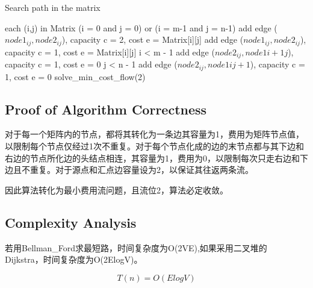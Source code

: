 \documentclass{article}
\begin{document}
\begin{CJK*}{UTF8}{gbsn}
\begin{algorithm}[htbp]  
  \caption{Search path in the matrix}  
  \begin{algorithmic}[1] 
	\For each (i,j) in Matrix
	\If (i = 0 and j = 0) or (i = m-1 and j = n-1)
	\State add edge ($node1_{ij}, node2_{ij}$), capacity c = 2, cost e = Matrix[i][j]
	\Else
	\State add edge ($node1_{ij}, node2_{ij}$), capacity c = 1, cost e = Matrix[i][j]
	\EndIf
	\If i < m - 1 
	\State add edge ($node2_{ij}, node1{i+1j}$), capacity c = 1, cost e = 0
	\EndIf
	\If j < n - 1
	\State add edge ($node2_{ij}, node1{ij+1}$), capacity c = 1, cost e = 0
	\EndIf
	\EndFor
	\State solve\_min\_cost\_flow(2)
    \EndFunction 
  \end{algorithmic}  
\end{algorithm} 

\subsection{Proof of Algorithm Correctness}
对于每一个矩阵内的节点，都将其转化为一条边其容量为1，费用为矩阵节点值，以限制每个节点仅经过1次不重复。对于每个节点化成的边的末节点都与其下边和右边的节点所化边的头结点相连，其容量为1，费用为0，以限制每次只走右边和下边且不重复。对于源点和汇点边容量设为2，以保证其往返两条流。

因此算法转化为最小费用流问题，且流位2，算法必定收敛。


\subsection{Complexity Analysis}
若用Bellman\_Ford求最短路，时间复杂度为O(2VE),如果采用二叉堆的 Dijkstra，时间复杂度为O(2ElogV)。

\begin{equation}
T(n) = O(ElogV)
\end{equation}

\end{CJK*}
\end{document}

